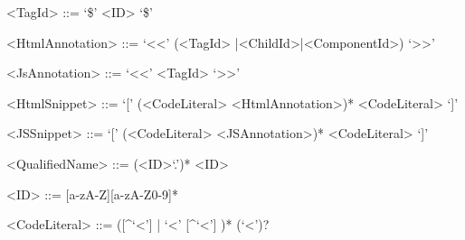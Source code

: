 \documentclass{article}
\begin{document}
{\begin{grammar}
<TagId> ::= `\$' <ID> `\$' 

<HtmlAnnotation> ::= `<<' (<TagId> |<ChildId>|<ComponentId>) `>>'

<JsAnnotation> ::= `<<' <TagId> `>>'

<HtmlSnippet> ::= `[' (<CodeLiteral> <HtmlAnnotation>)*  <CodeLiteral> `]'

<JSSnippet> ::= `[' (<CodeLiteral> <JSAnnotation>)*  <CodeLiteral> `]'

<QualifiedName> ::= (<ID>`.')* <ID>

<ID> ::= [a-zA-Z][a-zA-Z0-9]*

<CodeLiteral> ::= ([\^{}`<'] | `<' [\^{}`<'] )* (`<')?


\end{grammar}

}
\end{document}
